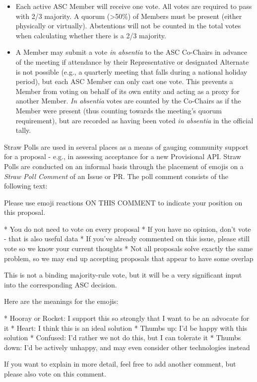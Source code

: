 \documentclass{article}
\newenvironment{Shaded}{\begin{snugshade}}{\end{snugshade}}
\newcommand{\BaseNTok}[1]{\textcolor[rgb]{0.00,0.00,0.81}{#1}}
\newcommand{\NormalTok}[1]{#1}
\begin{document}
\begin{itemize}
\item
  Each active ASC Member will receive one vote. All votes are required
  to pass with 2/3 majority. A quorum (\textgreater50\%) of Members must
  be present (either physically or virtually). Abstentions will not be
  counted in the total votes when calculating whether there is a 2/3
  majority.
\item
  A Member may submit a vote \emph{in absentia} to the ASC Co-Chairs in
  advance of the meeting if attendance by their Representative or
  designated Alternate is not possible (e.g., a quarterly meeting that
  falls during a national holiday period), but each ASC Member can only
  cast one vote. This prevents a Member from voting on behalf of its own
  entity and acting as a proxy for another Member. \emph{In absentia}
  votes are counted by the Co-Chairs as if the Member were present (thus
  counting towards the meeting's quorum requirement), but are recorded
  as having been voted \emph{in absentia} in the official tally.
\end{itemize}

Straw Polls are used in several places as a means of gauging
community support for a proposal - e.g., in assessing acceptance for a
new Provisional API. Straw Polls are conducted on an informal basis
through the placement of emojis on a \textit{Straw Poll Comment} of an Issue or PR.
The poll comment consists of the following text:

\begin{Shaded}
\begin{Highlighting}[]
\NormalTok{Please use emoji reactions ON THIS COMMENT to indicate your position on this proposal.}

\BaseNTok{    * You do not need to vote on every proposal}
\BaseNTok{    * If you have no opinion, don't vote - that is also useful data}
\BaseNTok{    * If you've already commented on this issue, please still vote so}
\BaseNTok{          we know your current thoughts}
\BaseNTok{    * Not all proposals solve exactly the same problem, so we may end}
\BaseNTok{          up accepting proposals that appear to have some overlap}

\NormalTok{This is not a binding majority-rule vote, but it will be a very}
\NormalTok{significant input into the corresponding ASC decision.}

\NormalTok{Here are the meanings for the emojis:}

\BaseNTok{    * Hooray or Rocket: I support this so strongly that I}
\BaseNTok{          want to be an advocate for it}
\BaseNTok{    * Heart: I think this is an ideal solution}
\BaseNTok{    * Thumbs up: I'd be happy with this solution}
\BaseNTok{    * Confused: I'd rather we not do this, but I can tolerate it}
\BaseNTok{    * Thumbs down: I'd be actively unhappy, and may even consider}
\BaseNTok{          other technologies instead}

\NormalTok{If you want to explain in more detail, feel free to add another}
\NormalTok{comment, but please also vote on this comment.}
\end{Highlighting}
\end{Shaded}
\end{document}
